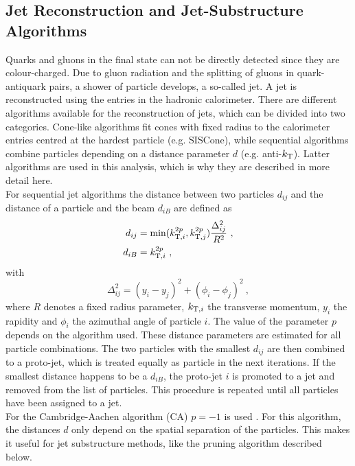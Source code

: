 \subsection{Jet Reconstruction and Jet-Substructure Algorithms}
\label{sec:pruning}
Quarks and gluons in the final state can not be directly detected since they are colour-charged. Due to gluon radiation and the splitting of gluons in quark-antiquark pairs, a shower of particle develops, a so-called jet. A jet is reconstructed using the entries in the hadronic calorimeter. There are different algorithms available for the reconstruction of jets, which can be divided into two categories. Cone-like algorithms fit cones with fixed radius to the calorimeter entries centred at the hardest particle (e.g. SISCone), while sequential algorithms combine particles depending on a distance parameter $d$ (e.g. anti-$k_{\rm T}$). Latter algorithms are used in this analysis, which is why they are described in more detail here.\\

\noindent For sequential jet algorithms the distance between two particles $d_{ij}$ and the distance of a particle and the beam $d_{iB}$ are defined as
\begin{align}
d_{ij} &= \min(k_{{\rm T},i}^{2p},k_{{\rm T},j}^{2p})\frac{\Delta_{ij}^2}{R^2} ~, \\
d_{iB} &= k_{{\rm T},i}^{2p} ~,
\end{align}
with
\begin{equation}
\Delta_{ij}^2 = (y_i-y_j)^2 + (\phi_i - \phi_j)^2 ~, \label{eq:reco:deltar}
\end{equation}
where $R$ denotes a fixed radius parameter, $k_{{\rm T},i}$ the transverse momentum, $y_i$ the rapidity and $\phi_i$ the azimuthal angle of particle $i$. The value of the parameter $p$ depends on the algorithm used. These distance parameters are estimated for all particle combinations. The two particles with the smallest $d_{ij}$ are then combined to a proto-jet, which is treated equally as particle in the next iterations. If the smallest distance happens to be a $d_{iB}$, the proto-jet $i$ is promoted to a jet and removed from the list of particles. This procedure is repeated until all particles have been assigned to a jet.\\

\noindent For the Cambridge-Aachen algorithm (CA) $p=-1$ is used \cite{CA}. For this algorithm, the distances $d$ only depend on the spatial separation of the particles. This makes it useful for jet substructure methods, like the pruning algorithm described below.\\

